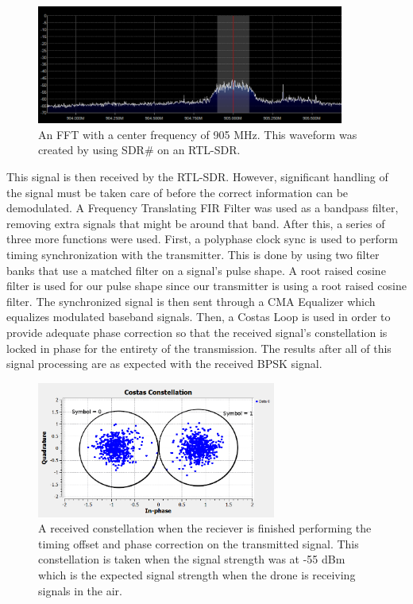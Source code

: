\begin{figure}[h]
  \centering
  \includegraphics[width=0.9\textwidth]{img/rxspectrum.PNG}
  \caption{An FFT with a center frequency of 905 MHz.  This waveform was created by using SDR\# on an RTL-SDR.}
  \label{fig:rxspectrum}
\end{figure}

This signal is then received by the RTL-SDR.  However, significant handling of the signal must be taken care of before the correct information can be demodulated. A Frequency Translating FIR Filter was used as a bandpass filter, removing extra signals that might be around that band. After this, a series of three more functions were used. First, a polyphase clock sync is used to perform timing synchronization with the transmitter. This is done by using two filter banks that use a matched filter on a signal’s pulse shape. A root raised cosine filter is used for our pulse shape since our transmitter is using a root raised cosine filter. The synchronized signal is then sent through a CMA Equalizer which equalizes modulated baseband signals. Then, a Costas Loop is used in order to provide adequate phase correction so that the received signal's constellation is locked in phase for the entirety of the transmission.  The results after all of this signal processing are as expected with the received BPSK signal. \par

\begin{figure}[h]
  \centering
  \includegraphics[width=0.70\textwidth]{img/constellation_labeled.PNG}
  \caption{A received constellation when the reciever is finished performing the timing offset and phase correction on the transmitted signal.  This constellation is taken when the signal strength was at -55 dBm which is the expected signal strength when the drone is receiving signals in the air.}
  \label{fig:constellation}
\end{figure} \par

